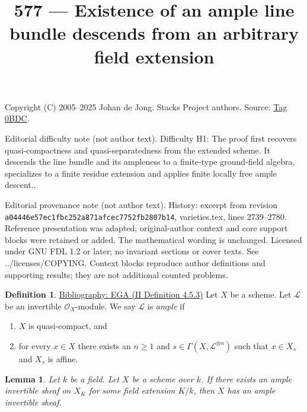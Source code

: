 \documentclass{amsart}
\newenvironment{reference}{\comment}{\endcomment}
\theoremstyle{plain}
\newtheorem{lemma}[subsection]{Lemma}
\theoremstyle{definition}
\newtheorem{definition}[subsection]{Definition}
\theoremstyle{remark}
\numberwithin{equation}{subsection}
\begin{document}
\title[Stacks Project, Tag 0BDC]{577 --- Existence of an ample line bundle descends from an arbitrary field extension}
\maketitle
\noindent Copyright (C) 2005--2025 Johan de Jong. Stacks Project authors. Source: \href{https://stacks.math.columbia.edu/tag/0BDC}{Tag 0BDC}.

\noindent Editorial difficulty note (not author text). Difficulty H1: The proof first recovers quasi-compactness and quasi-separatedness from the extended scheme. It descends the line bundle and its ampleness to a finite-type ground-field algebra, specializes to a finite residue extension and applies finite locally free ample descent..

\noindent Editorial provenance note (not author text). History: excerpt from revision \texttt{a0444\allowbreak 6e57e\allowbreak c1fbc\allowbreak 252a8\allowbreak 71afc\allowbreak ec775\allowbreak 2fb28\allowbreak 07b14}, varieties.tex, lines 2739--2780. Reference presentation was adapted; original-author context and core support blocks were retained or added. The mathematical wording is unchanged. Licensed under GNU FDL 1.2 or later; no invariant sections or cover texts. See ../licenses/COPYING. Context blocks reproduce author definitions and supporting results; they are not additional counted problems.

\begin{definition}
\label{properties-definition-ample}
\begin{reference}
\href{https://stacks.math.columbia.edu/bibliography}{Bibliography: EGA (II Definition 4.5.3)}
\end{reference}
Let $X$ be a scheme.
Let $\mathcal{L}$ be an invertible $\mathcal{O}_X$-module.
We say $\mathcal{L}$ is {\it ample} if
\begin{enumerate}
\item $X$ is quasi-compact, and
\item for every $x \in X$ there exists an $n \geq 1$
and $s \in \Gamma(X, \mathcal{L}^{\otimes n})$ such
that $x \in X_s$ and $X_s$ is affine.
\end{enumerate}
\end{definition}

\begin{lemma}
\label{lemma-ample-after-field-extension}
Let $k$ be a field. Let $X$ be a scheme over $k$.
If there exists an ample invertible sheaf on $X_K$ for some
field extension $K/k$, then $X$ has an ample invertible
sheaf.
\end{lemma}
\end{document}
